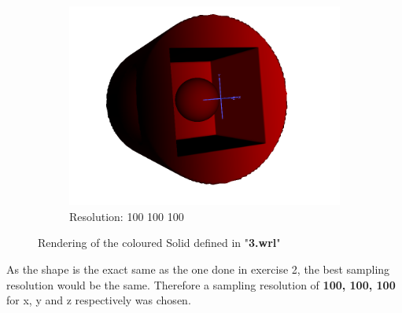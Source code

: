\documentclass[acmlarge,nonacm=true]{acmart}
\begin{document}
\begin{figure}[H]
	\begin{subfigure}{\textwidth}
	  \centering
	  \includegraphics[width=.6\linewidth]{fig/3}
	  \caption{Resolution: 100 100 100}
	\end{subfigure}%
	\caption{Rendering of the coloured Solid defined in "\textbf{3.wrl}"}
	\label{fig:3}
\end{figure}

As the shape is the exact same as the one done in exercise 2, the best sampling resolution would be the same.
Therefore a sampling resolution of \textbf{100, 100, 100} for x, y and z respectively was chosen.



\newpage
\end{document}

